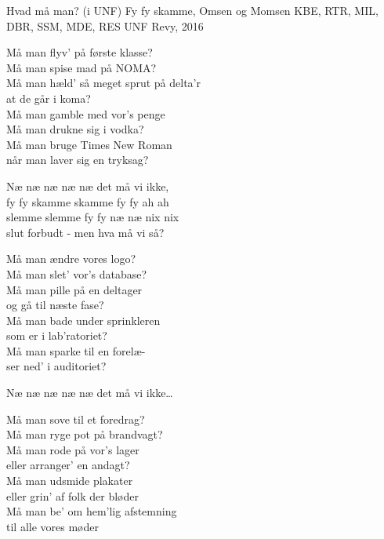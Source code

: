 \begin{song}{Hvad må man? (i UNF)}
  {} %
  {Fy fy skamme, Omsen og Momsen} %
  {KBE, RTR, MIL, DBR, SSM, MDE, RES} %
  {UNF Revy, 2016} %
  {\NotCCLIed} %

  \begin{SBVerse}
    Må man flyv’ på første klasse?\\
    Må man spise mad på NOMA?\\
    Må man hæld’ så meget sprut på delta’r\\
    at de går i koma?\\
    Må man gamble med vor’s penge \\
    Må man drukne sig i vodka?\\
    Må man bruge Times New Roman \\
    når man laver sig en tryksag?
  \end{SBVerse}

  \begin{SBChorus}
    Næ næ næ næ næ det må vi ikke,\\
    fy fy skamme skamme fy fy ah ah\\
    slemme slemme fy fy næ næ nix nix\\
    slut forbudt - men hva må vi så?
  \end{SBChorus}

  \begin{SBVerse}
    Må man ændre vores logo?\\
    Må man slet’ vor’s database?\\
    Må man pille på en deltager \\
    og gå til næste fase?\\
    Må man bade under sprinkleren\\
    som er i lab’ratoriet?\\
    Må man sparke til en forelæ-\\
    ser ned’ i auditoriet?
  \end{SBVerse}

  \begin{SBChorus}
    Næ næ næ næ næ det må vi ikke\ldots
  \end{SBChorus}

  \begin{SBVerse}
    Må man sove til et foredrag?\\
    Må man ryge pot på brandvagt?\\
    Må man rode på vor’s lager\\
    eller arranger’ en andagt?\\
    Må man udsmide plakater\\
    eller grin’ af folk der bløder\\
    Må man be’ om hem’lig afstemning\\
    til alle vores møder
  \end{SBVerse}


\end{song}
